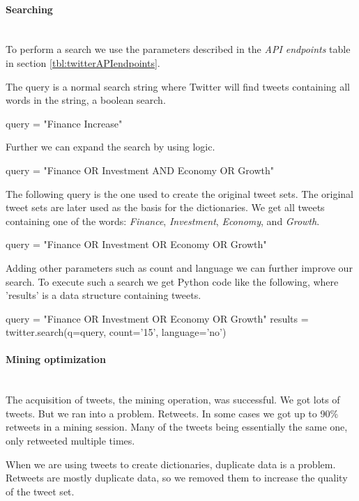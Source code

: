 \paragraph{Searching}
\hspace{0pt}\\
To perform a search we use the parameters described in the \textit{API
endpoints} table in section \ref{tbl:twitterAPIendpoints}.

The query is a normal search string where Twitter will
find tweets containing all words in the string, a boolean search. 
\begin{python}
query = "Finance Increase"
\end{python}

Further we can expand the search by using logic. 
\begin{python}
query = "Finance OR Investment AND Economy OR Growth"
\end{python}

The following query is the one used to create the original tweet sets. The
original tweet sets are later used as the basis for the dictionaries.
We get all tweets containing one of the words: \textit{Finance}, \textit{Investment}, \textit{Economy}, and \textit{Growth}.
\begin{python}
query = "Finance OR Investment OR Economy OR Growth"
\end{python}

Adding other parameters such as count and language we can further improve our
search. To execute such a search we get Python code like the following, where
'results' is a data structure containing tweets.
\begin{python}
query = "Finance OR Investment OR Economy OR Growth"
results = twitter.search(q=query, count='15', language='no')
\end{python}
%

\paragraph{Mining optimization}
\hspace{0pt}\\
The acquisition of tweets, the mining operation, was successful. We got lots
of tweets. But we ran into a problem. Retweets. In some cases we got up to 90\%
retweets in a mining session. Many of the tweets being essentially the same
one, only retweeted multiple times. 

When we are using tweets to create dictionaries, duplicate data is a problem.
Retweets are mostly duplicate data, so we removed them to increase the quality
of the tweet set.

